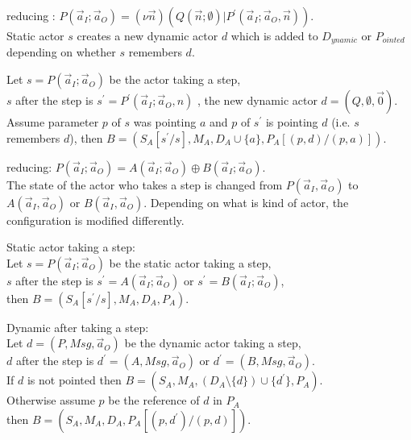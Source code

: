 \documentclass[a4paper]{report}
\numberwithin{algorithm}{chapter}
\begin{document}
\begin{define}
\begin{description}
\begin{description}
\end{description}


\item[Create (\ref{dyn_creation})] reducing : $P(\vec a_I; \vec a_O) = (\nu \vec n)(Q(\vec n;\emptyset) | P^\prime(\vec a_I ; \vec a_O , \vec n))$.\\
Static actor $s$ creates a new dynamic actor $d$ which is added to $D_{ynamic}$ or $P_{ointed}$ depending on whether $s$ remembers $d$.

Let $s = P(\vec a_I; \vec a_O)$ be the actor taking a step,\\
$s$ after the step is $s^\prime = P^\prime(\vec a_I; \vec a_O,n)$ ,
the new dynamic actor $d = (Q,\emptyset,\vec 0)$.\\
Assume parameter $p$ of $s$ was pointing $a$ and $p$ of $s^\prime$ is pointing $d$ (i.e. $s$ remembers $d$),
then $B = (S_A[s^\prime / s], M_A, D_A \cup \{a\}, P_A[(p,d)/(p,a)])$.


\item[Choice (\ref{dyn_choice})] reducing: $P(\vec a_I; \vec a_O) = A(\vec a_I; \vec a_O) \oplus B(\vec a_I; \vec a_O)$.\\
The state of the actor who takes a step is changed from $P(\vec a_I, \vec a_O)$ to $A(\vec a_I, \vec a_O)$ or $B(\vec a_I, \vec a_O)$.
Depending on what is kind of actor, the configuration is modified differently.

\begin{description}
\item Static actor taking a step: \\
Let $s = P(\vec a_I; \vec a_O)$ be the static actor taking a step,\\
$s$ after the step is $s^\prime = A(\vec a_I; \vec a_O)$ or  $s^\prime = B(\vec a_I; \vec a_O)$,\\
then $B = (S_A[s^\prime / s], M_A, D_A, P_A)$.

\item Dynamic after taking a step: \\
Let $d = (P,\mathit{Msg},\vec a_O)$ be the dynamic actor taking a step,\\
$d$ after the step is $d^\prime = (A,\mathit{Msg},\vec a_O)$ or $d^\prime = (B,\mathit{Msg},\vec a_O)$.\\
If $d$ is not pointed then $B = (S_A, M_A, (D_A \setminus \{d\}) \cup \{d^\prime\}, P_A)$.\\
Otherwise assume $p$ be the reference of $d$ in $P_A$\\
then $B = (S_A, M_A, D_A, P_A[ (p,d^\prime) / (p,d) ])$.

\end{description}

\end{description}
\end{define}
\end{document}
